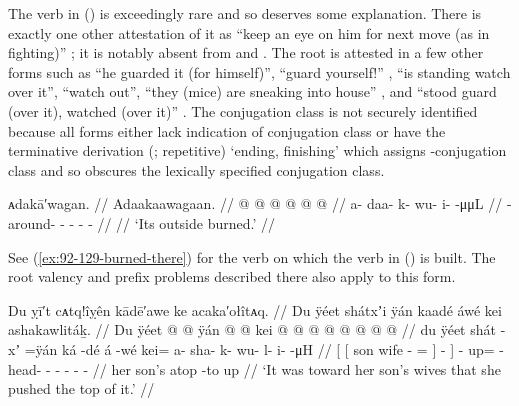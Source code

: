 The verb in (\lastx) is exceedingly rare and so deserves some explanation.
There is exactly one other attestation of it as  “keep an eye on him for next move (as in fighting)” \parencite[02/236]{leer:1973}; it is notably absent from \cite{leer:1976} and \cite{story-naish:1973}.
The root is attested in a few other forms such as  “he guarded it (for himself)”,  “guard yourself!” \parencite[both][19]{leer:1963},  “is standing watch over it”,  “watch out”,  “they (mice) are sneaking into house” \parencite[both][02/236]{leer:1973}, and  “stood guard (over it), watched (over it)” \parencite[133]{leer:1976}.
The conjugation class is not securely identified because all forms either lack indication of conjugation class or have the terminative derivation  (;  repetitive) ‘ending, finishing’ which assigns -conjugation class and so obscures the lexically specified conjugation class.

\ex\label{ex:92-132-outside-burned}%
%
\begingl
	\glpreamble	ᴀdakā′wagan. //
	\glpreamble	Adaakaawagaan. //
	\gla	{} @ {} @ {} @ {} @ {} @ {} @ {} //
	\glb	a- daa- k- wu- i-  -μμL //
	\glc	{}- around- - - -  - //
	\gld	{} {} {} {} {} {} {} //
	\glft	‘Its outside burned.’
		//
\endgl
\xe

See (\ref{ex:92-129-burned-there}) for the verb  on which the verb in (\lastx) is built.
The root valency and  prefix problems described there also apply to this form.

\ex\label{ex:92-133-push-it-at-them}%
%
\begingl
	\glpreamble	Du ỵī′t cᴀtq!îỵên kādē′awe ke acaka′ołîtᴀq. //
	\glpreamble	Du ÿéet shátxʼi ÿán kaadé áwé kei ashakawlitáḵ. //
	\gla	{} {} Du ÿéet  @ {} @ \•ÿán {}  @ {} {}
		 @ {}
		kei @  @ {} @ {} @ {} @ {} @ {} @ {} @ {} //
	\glb	{} {} du ÿéet shát -xʼ =ÿán {} ká -dé {}
		á -wé
		kei= a- sha- k- wu- l- i-  -μH //
	\glc	{}[ {}[  son wife - = {}]
			 - {}]
		 -
		up= - head- - - - -
			 - //
	\gld	{} {} her son’s  {} {} {} atop -to {}
		 {}
		up  {} {} {} {} {} {} {} //
	\glft	‘It was toward her son’s wives that she pushed the top of it.’
		//
\endgl
\xe

